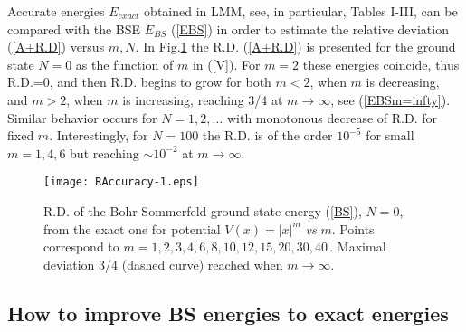 \documentclass[preprint,preprintnumbers,amsmath,amssymb]{revtex4}
\newcommand{\rar}{\rightarrow}
\begin{document}
Accurate energies $E_{exact}$ obtained in LMM, see, in particular, Tables I-III, can be compared with the BSE   $E_{BS}$ (\ref{EBS}) in order to estimate the relative deviation (\ref{A+R.D}) versus $m, N$. In Fig.\ref{N=0} the R.D. (\ref{A+R.D}) is presented for the ground state $N=0$ as the function of $m$ in (\ref{V}). For $m=2$ these energies coincide, thus R.D.=0, and then R.D. begins to grow for both $m<2$, when $m$ is decreasing, and $m>2$, when $m$ is increasing, reaching 3/4 at $m \rar \infty$, see (\ref{EBSm=infty}). Similar behavior occurs for $N=1,2,\ldots$ with monotonous decrease of R.D. for fixed $m$. Interestingly, for $N=100$ the R.D. is of the order $10^{-5}$ for small $m=1,4,6$ but reaching $\sim 10^{-2}$ at $m \rar \infty$.
\begin{figure}[h]
	\centering
	\texttt{[image: RAccuracy-1.eps]}
\caption{R.D. of the Bohr-Sommerfeld ground state energy (\ref{BS}), $N=0$,
         from the exact one for potential $V(x)=|x|^{m}$ {\it vs} $m$. Points correspond to $m=1,2,3,4,6,8,10,12,15,20,30,40$\,. Maximal deviation 3/4 (dashed curve) reached when $m\rar\infty$.}
\label{N=0}
\end{figure}

\subsection*{How to improve BS energies to exact energies}
\end{document}
